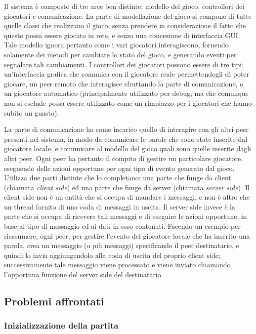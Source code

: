 \documentclass[10.5pt]{article}
\begin{document}
Il sistema è composto di tre aree ben distinte: modello del gioco, controllori dei giocatori e comunicazione. La parte di modellazione del gioco si compone di tutte quelle classi che realizzano il gioco, senza prendere in considerazione il fatto che questo possa essere giocato in rete, e senza una concezione di interfaccia GUI. Tale modello ignora pertanto come i vari giocatori interagiscono, fornendo solamente dei metodi per cambiare lo stato del gioco, e generando eventi per segnalare tali cambiamenti. I controllori dei giocatori possono essere di tre tipi: un'interfaccia grafica che comunica con il giocatore reale permettendogli di poter giocare, un peer remoto che interagisce sfruttando la parte di comunicazione, o un giocatore automatico (principalmente utilizzato per debug, ma che comunque non si esclude possa essere utilizzato come un rimpiazzo per i giocatori che hanno subito un guasto).

La parte di comunicazione ha come incarico quello di interagire con gli altri peer presenti nel sistema, in modo da comunicare le parole che sono state inserite dal giocatore locale, e comunicare al modello del gioco quali sono quelle inserite dagli altri peer. Ogni peer ha pertanto il compito di gestire un particolare giocatore, eseguendo delle azioni opportune per ogni tipo di evento generato dal gioco. Utilizza due parti distinte che lo completano: una parte che funge da client (chiamata \emph{client side}) ed una parte che funge da server (chiamata \emph{server side}). Il client side non è un entità che si occupa di mandare i messaggi, e non è altro che un thread fornito di una coda di messaggi in uscita. Il server side invece è la parte che si occupa di ricevere tali messaggi e di eseguire le azioni opportune, in base al tipo di messaggio ed ai dati in esso contenuti. Facendo un esempio per riassumere, ogni peer, per gestire l'evento del giocatore locale che ha inserito una parola, crea un messaggio (o più messaggi) specificando il peer destinatario, e quindi lo invia aggiungendolo alla coda di uscita del proprio client side; successivamente tale messaggio viene processato e viene inviato chiamando l'opportuna funzione del server side del destinatario. 

\subsection{Problemi affrontati}

\subsubsection{Inizializzazione della partita}
\end{document}
